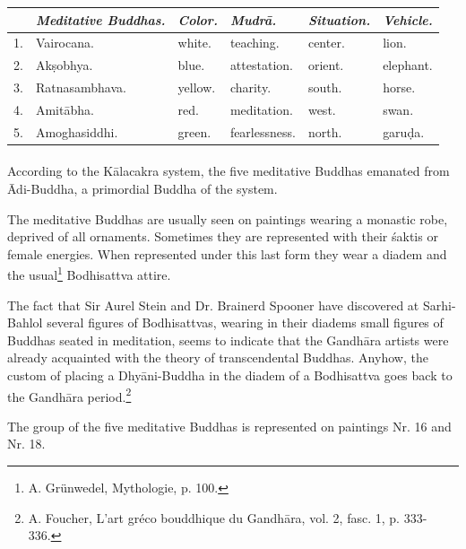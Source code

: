 \documentclass[a4paper, 12pt, oneside]{article}
\begin{document}
\begin{table}[H]
    \centering
    \bfseries
    \footnotesize
    \begin{tabular}{l l l l l l}
   
        ~ &  \emph{Meditative Buddhas.}  &  \emph{Color.}  &  \emph{Mudr\={a}.}       &  \emph{Situation.}  &  \emph{Vehicle.}  \\ \hline
        1. &  Vairocana.             &  white.    &  teaching.      &  center.       &  lion.       \\
        2. &  Ak\d{s}obhya.              &  blue.     &  attestation.   &  orient.       &  elephant.   \\
        3. &  Ratnasambhava.         &  yellow.   &  charity.       &  south.        &  horse.      \\
        4. &  Amit\={a}bha.              &  red.      &  meditation.    &  west.         &  swan.       \\
        5. &  Amoghasiddhi.          &  green.    &  fearlessness.  &  north.        &  garu\d{d}a. \\
    \end{tabular}
\end{table}
\paragraph{}
According to the K\={a}lacakra system, the five meditative Buddhas emanated from \={A}di-Buddha, a primordial Buddha of the system.

The meditative Buddhas are usually seen on paintings wearing a monastic robe, deprived of all ornaments. Sometimes they are represented with their \'{s}aktis or female energies. When represented under this last form they wear a diadem and the usual\footnote{A. Grünwedel, Mythologie, p. 100.} Bodhisattva attire.

The fact that Sir Aurel Stein and Dr. Brainerd Spooner have discovered at Sarhi-Bahlol several figures of Bodhisattvas, wearing in their diadems small figures of Buddhas seated in meditation, seems to indicate that the Gandh\={a}ra artists were already acquainted with the theory of transcendental Buddhas. Anyhow, the custom of placing a Dhy\={a}ni-Buddha in the diadem of a Bodhisattva goes back to the Gandh\={a}ra period.\footnote{A. Foucher, L'art gréco bouddhique du Gandh\={a}ra, vol. 2, fasc. 1, p. 333-336.}

The group of the five meditative Buddhas is represented on paintings Nr. 16 and Nr. 18.
\end{document}
